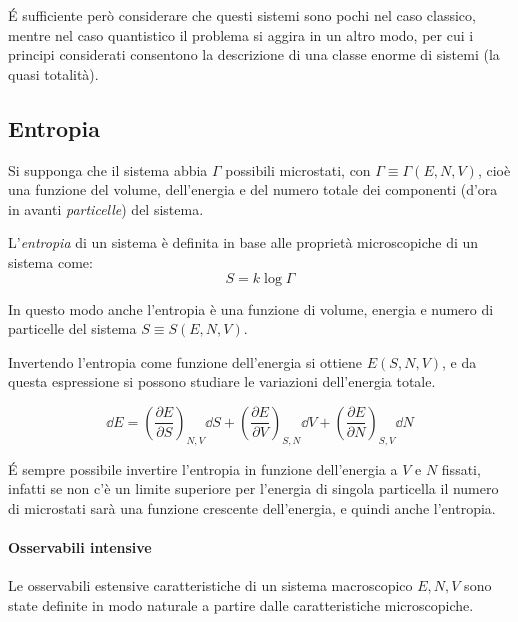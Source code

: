 \'E sufficiente però considerare che questi sistemi sono pochi nel caso classico, mentre nel caso quantistico il problema si aggira in un altro modo, per cui i principi considerati consentono la descrizione di una classe enorme di sistemi (la quasi totalità).

\subsection{Entropia}
\label{sec:entro}

Si supponga che il sistema abbia $\Gamma$ possibili microstati, con $\Gamma \equiv \Gamma(E,N,V)$, cioè una funzione del volume, dell'energia e del numero totale dei componenti (d'ora in avanti \textit{particelle}) del sistema.

\begin{defn}
	L'\textit{entropia} di un sistema è definita in base alle proprietà microscopiche di un sistema come:
	\begin{equation*}
	S = k \log\Gamma
	\end{equation*}
\end{defn}

In questo modo anche l'entropia è una funzione di volume, energia e numero di particelle del sistema $S \equiv S(E,N,V)$.

Invertendo l'entropia come funzione dell'energia si ottiene $E(S,N,V)$, e da questa espressione si possono studiare le variazioni dell'energia totale.

\begin{equation*}
	\dd E = \left(\frac{\partial E}{\partial S}\right)_{N,V} \dd S + \left(\frac{\partial E}{\partial V}\right)_{S,N} \dd V + \left(\frac{\partial E}{\partial N}\right)_{S,V} \dd N
\end{equation*}

\begin{note}[Invertibilità di $S(E,N,V)$]
	\'E sempre possibile invertire l'entropia in funzione dell'energia a $V$ e $N$ fissati, infatti se non c'è un limite superiore per l'energia di singola particella il numero di microstati sarà una funzione crescente dell'energia, e quindi anche l'entropia.
\end{note}

\paragraph{Osservabili intensive} Le osservabili estensive caratteristiche di un sistema macroscopico $E, N, V$ sono state definite in modo naturale a partire dalle caratteristiche microscopiche.

